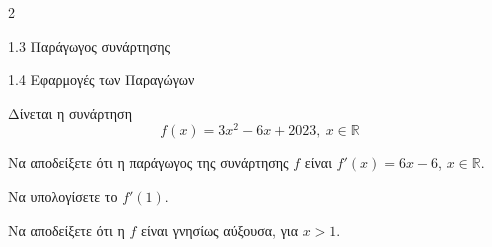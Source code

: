 \begin{ylh}{2}
\item 1.3 Παράγωγος συνάρτησης
\item 1.4 Εφαρμογές των Παραγώγων
\end{ylh}
Δίνεται η συνάρτηση
\[ f(x) = 3x^2 - 6x + 2023, \ x \in \mathbb{R} \]
\begin{alist}
    \item Να αποδείξετε ότι η παράγωγος της συνάρτησης $f$ είναι $f'(x) = 6x - 6$, $x \in \mathbb{R}$. 
    \item Να υπολογίσετε το $f'(1)$. 
    \item Να αποδείξετε ότι η $f$ είναι γνησίως αύξουσα, για $x > 1$. 
\end{alist}

